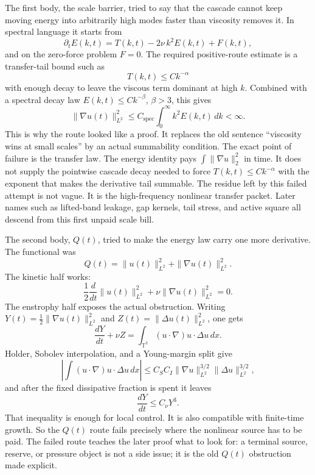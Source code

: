 The first body, the scale barrier, tried to say that the cascade cannot keep
moving energy into arbitrarily high modes faster than viscosity removes it.
In spectral language it starts from
\[
  \partial_t E(k,t)=T(k,t)-2\nu\,k^2E(k,t)+F(k,t),
\]
and on the zero-force problem \(F=0\).
The required positive-route estimate is a transfer-tail bound such as
\[
  T(k,t)\le Ck^{-\alpha}
\]
with enough decay to leave the viscous term dominant at high \(k\).
Combined with a spectral decay law \(E(k,t)\le Ck^{-\beta}\), \(\beta>3\), this
gives
\[
  \|\nabla u(t)\|_{L^2}^2
  \le
  C_{\mathrm{spec}}\int_0^\infty k^2E(k,t)\,dk
  <\infty .
\]
This is why the route looked like a proof.
It replaces the old sentence ``viscosity wins at small scales'' by an actual
summability condition.
The exact point of failure is the transfer law.
The energy identity pays \(\int\|\nabla u\|_2^2\) in time.
It does not supply the pointwise cascade decay needed to force
\(T(k,t)\le Ck^{-\alpha}\) with the exponent that makes the derivative tail
summable.
The residue left by this failed attempt is not vague.
It is the high-frequency nonlinear transfer packet.
Later names such as lifted-band leakage, gap kernels, tail stress, and active
square all descend from this first unpaid scale bill.

The second body, \(Q(t)\), tried to make the energy law carry one more
derivative.
The functional was
\[
  Q(t)=\|u(t)\|_{L^2}^2+\|\nabla u(t)\|_{L^2}^2 .
\]
The kinetic half works:
\[
  \frac12\frac{d}{dt}\|u(t)\|_{L^2}^2
  +\nu\|\nabla u(t)\|_{L^2}^2=0 .
\]
The enstrophy half exposes the actual obstruction.
Writing \(Y(t)=\frac12\|\nabla u(t)\|_{L^2}^2\) and
\(Z(t)=\|\Delta u(t)\|_{L^2}^2\), one gets
\[
  \frac{dY}{dt}+\nu Z
  =
  \int_{\mathbb T^3}(u\cdot\nabla)u\cdot\Delta u\,dx .
\]
Holder, Sobolev interpolation, and a Young-margin split give
\[
  \left|\int (u\cdot\nabla)u\cdot\Delta u\,dx\right|
  \le
  C_S C_I
  \|\nabla u\|_{L^2}^{3/2}\|\Delta u\|_{L^2}^{3/2},
\]
and after the fixed dissipative fraction is spent it leaves
\[
  \frac{dY}{dt}\le C_\nu Y^3 .
\]
That inequality is enough for local control.
It is also compatible with finite-time growth.
So the \(Q(t)\) route fails precisely where the nonlinear source has to be
paid.
The failed route teaches the later proof what to look for: a terminal source,
reserve, or pressure object is not a side issue; it is the old \(Q(t)\)
obstruction made explicit.

